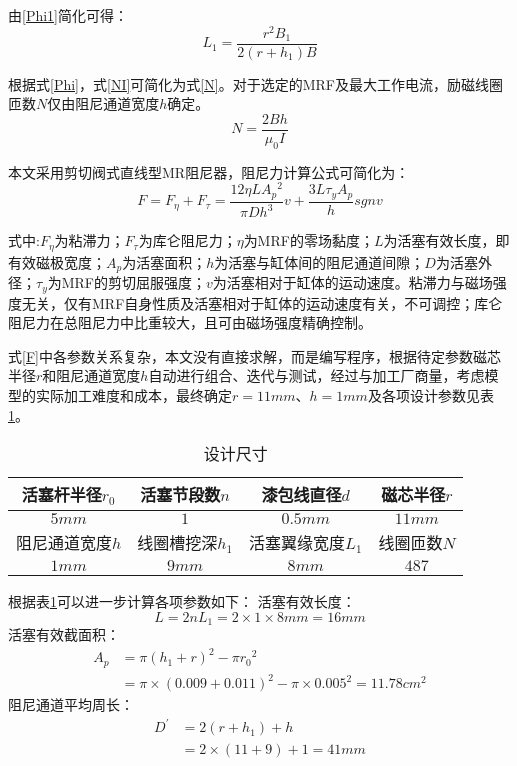 由\eqref{Phi1}简化可得：
\begin{equation}
L_1=\frac{r^2B_1}{2\left(r+h_1\right)B}
\end{equation}

根据式\eqref{Phi}，式\eqref{NI}可简化为式\eqref{N}。对于选定的MRF及最大工作电流，励磁线圈匝数$N$仅由阻尼通道宽度$h$确定。
\begin{equation}
N=\frac{2Bh}{\mu_0I}\label{N}
\end{equation}

本文采用剪切阀式直线型MR阻尼器，阻尼力计算公式可简化为：
\begin{equation}
F=F_{\eta}+F_{\tau}=\frac{12\eta LA{_p}{^2}}{\pi Dh^3}v+\frac{3L\tau_yA_p}{h}sgnv\label{F}
\end{equation}

式中:$F_{\eta}$为粘滞力；$F_{\tau}$为库仑阻尼力；$\eta$为MRF的零场黏度；$L$为活塞有效长度，即有效磁极宽度；$A_p$为活塞面积；$h$为活塞与缸体间的阻尼通道间隙；$D$为活塞外径；$\tau_y$为MRF的剪切屈服强度；$v$为活塞相对于缸体的运动速度。粘滞力与磁场强度无关，仅有MRF自身性质及活塞相对于缸体的运动速度有关，不可调控；库仑阻尼力在总阻尼力中比重较大，且可由磁场强度精确控制。

式\eqref{F}中各参数关系复杂，本文没有直接求解，而是编写程序，根据待定参数磁芯半径$r$和阻尼通道宽度$h$自动进行组合、迭代与测试，经过与加工厂商量，考虑模型的实际加工难度和成本，最终确定$r=11mm$、$h=1mm$及各项设计参数见表\ref{element}。

\begin{table}[H]
\centering
\caption{设计尺寸}
\label{element}

\begin{tabular}{|c|c|c|c|}
\hline 活塞杆半径$r_0$ & 活塞节段数$n$ & 漆包线直径$d$ & 磁芯半径$r$ \\
\hline $5mm$ & $1$ & $0.5mm$ & $11mm$ \\
\hline 阻尼通道宽度$h$ & 线圈槽挖深$h_1$ & 活塞翼缘宽度$L_1$ & 线圈匝数$N$ \\
\hline $1mm$ & $9mm$ & $8mm$ & $487$ \\
\hline

\end{tabular}
\end{table}

根据表\ref{element}可以进一步计算各项参数如下：
活塞有效长度：
\begin{equation}
L=2nL_1=2\times1\times8mm=16mm
\end{equation}
活塞有效截面积：
\begin{equation}
\begin{split}
A_p&=\pi\left(h_1+r\right)^2-\pi r{_0}{^2}\\&=\pi\times\left(0.009+0.011\right)^2-\pi\times0.005^2=11.78cm^2
\end{split}
\end{equation}
阻尼通道平均周长：
\begin{equation}
\begin{split}
D^{'}&=2\left(r+h_1\right)+h\\&=2\times\left(11+9\right)+1=41mm
\end{split}
\end{equation}


